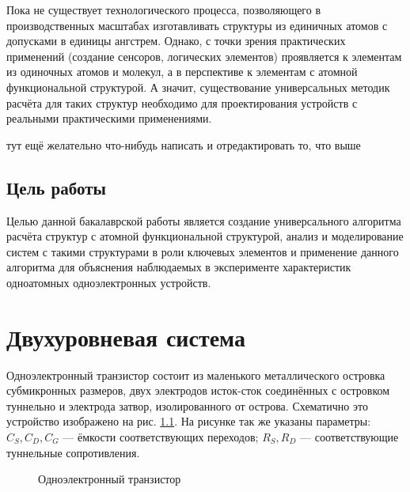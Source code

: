 \documentclass[12pt,a4paper]{report}
\begin{document}
Пока не существует технологического процесса, позволяющего в производственных масштабах изготавливать структуры из единичных атомов с допусками в единицы ангстрем. Однако, с точки зрения практических применений (создание сенсоров, логических элементов) проявляется к элементам из одиночных атомов и молекул, а в перспективе к элементам с атомной функциональной структурой. А значит, существование универсальных методик расчёта для таких структур необходимо для проектирования устройств с реальными практическими применениями.

тут ещё желательно что-нибудь написать и отредактировать то, что выше

\section*{Цель работы}

Целью данной бакалаврской работы является создание универсального алгоритма расчёта структур с атомной функциональной структурой, анализ и моделирование систем с такими структурами в роли ключевых элементов и применение данного алгоритма для объяснения наблюдаемых в эксперименте характеристик одноатомных одноэлектронных устройств.

\chapter{Двухуровневая система}

Одноэлектронный транзистор состоит из маленького металлического островка субмикронных размеров, двух электродов исток-сток соединённых с островком туннельно и электрода затвор, изолированного от острова. Схематично это устройство изображено на рис. \ref{fig:SET}. На рисунке так же указаны параметры: $C_S, C_D, C_G$ — ёмкости соответствующих переходов; $R_S, R_D$ — соответствующие туннельные сопротивления.

\begin{figure}
	\caption{Одноэлектронный транзистор}
	\label{fig:SET}
\end{figure}
\end{document}
